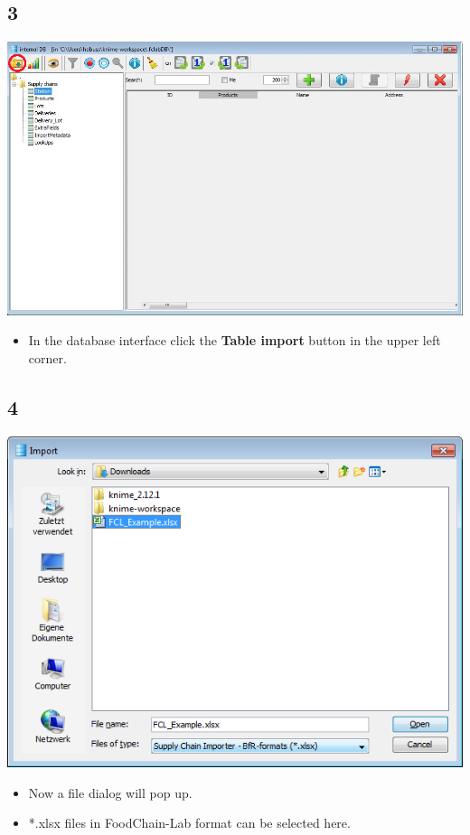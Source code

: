 \documentclass{beamer}
\begin{document}
\subsection{3}
\begin{frame}
	\begin{center}
  		\includegraphics[height=0.6\textheight]{3.png}
	\end{center}
	\begin{itemize}
		\item In the database interface click the \textbf{Table import} button in the upper left corner.
	\end{itemize}
\end{frame}

\subsection{4}
\begin{frame}
	\begin{center}
  		\includegraphics[height=0.6\textheight]{4.png}
	\end{center}
	\begin{itemize}
		\item Now a file dialog will pop up.
		\item *.xlsx files in FoodChain-Lab format can be selected here.
	\end{itemize}
\end{frame}
\end{document}

